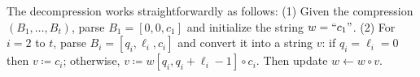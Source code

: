 The decompression works straightforwardly as follows: (1) Given the compression $(B_1,\ldots,B_t)$, parse $B_1=[0,0,c_1]$ and initialize the string $w=``c_1"$. (2) For $i=2$ to $t$, parse $B_i=[q_i,\ell_i,c_i]$ and convert it into a string $v$: if $q_i=\ell_i=0$ then $v\coloneqq c_i$; otherwise, $v\coloneqq w[q_i,q_i+\ell_i-1]\circ c_i$. Then update $w\gets w\circ v$. 









